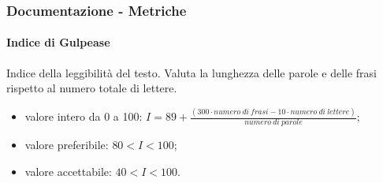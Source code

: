 		\subsubsection{Documentazione - Metriche}
		\paragraph{Indice di Gulpease}
		Indice della leggibilità del testo. Valuta la lunghezza delle parole e delle frasi rispetto al numero totale di lettere.
		\begin{itemize}
		\item valore intero da 0 a 100: $I = 89 + \frac{(300 \cdot numero \ di \ frasi - 10 \cdot numero \ di \ lettere)}{numero \ di \ parole}$;
		\item valore preferibile: $80 < I < 100$;
		\item valore accettabile: $40 < I < 100$.
		\end{itemize}
